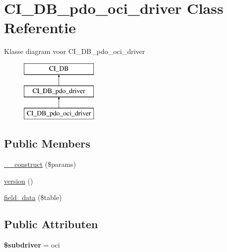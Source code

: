 \hypertarget{class_c_i___d_b__pdo__oci__driver}{}\section{C\+I\+\_\+\+D\+B\+\_\+pdo\+\_\+oci\+\_\+driver Class Referentie}
\label{class_c_i___d_b__pdo__oci__driver}
Klasse diagram voor C\+I\+\_\+\+D\+B\+\_\+pdo\+\_\+oci\+\_\+driver\begin{figure}[H]
\begin{center}
\leavevmode
\includegraphics[height=3.000000cm]{class_c_i___d_b__pdo__oci__driver}
\end{center}
\end{figure}
\subsection*{Public Members}
\begin{DoxyCompactItemize}
\item 
\mbox{\hyperlink{class_c_i___d_b__pdo__oci__driver_a9162320adff1a1a4afd7f2372f753a3e}{\+\_\+\+\_\+construct}} (\$params)
\item 
\mbox{\hyperlink{class_c_i___d_b__pdo__oci__driver_a6080dae0886626b9a4cedb29240708b1}{version}} ()
\item 
\mbox{\hyperlink{class_c_i___d_b__pdo__oci__driver_a90355121e1ed009e0efdbd544ab56efa}{field\+\_\+data}} (\$table)
\end{DoxyCompactItemize}
\subsection*{Public Attributen}
\begin{DoxyCompactItemize}
\item 
\mbox{\label{class_c_i___d_b__pdo__oci__driver_a1322ca756348b11d080cb7a4f590de15}} 
{\bfseries \$subdriver} = \textquotesingle{}oci\textquotesingle{}
\end{DoxyCompactItemize}
